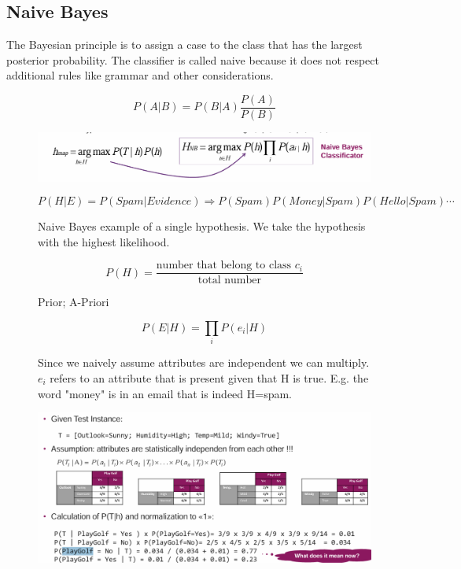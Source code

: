 \documentclass[../Main.tex]{subfiles}
\begin{document}
\subsection{Naive Bayes}
The Bayesian principle is to assign a case to the 
class that has the largest posterior probability.
The classifier is called naive because it does not respect additional rules like grammar and other considerations.
\begin{figure}[H]
    \begin{equation}
        P(A|B) = P(B|A) \frac{P(A)}{P(B)}
    \end{equation}
\end{figure}
\begin{figure}[H]
    \centering
    \includegraphics[width=0.75\linewidth]{Images/datan/naive-bayes.png}
\end{figure}
\begin{figure}[H]
    \begin{equation}
        P(H|E) = P(Spam|Evidence) \Rightarrow P(Spam) P(Money | Spam) P(Hello | Spam) \cdots
    \end{equation}
    \caption{Naive Bayes example of a single hypothesis. We take the hypothesis with the highest likelihood.}
\end{figure}
\begin{figure}[H]
    \begin{equation}
        P(H) = \frac{\text{number that belong to class }c_i}{\text{total number}}
    \end{equation}
    \caption{Prior; A-Priori}
\end{figure}
\begin{figure}[H]
    \begin{equation}
        P(E|H) = \prod_i P(e_i|H)
    \end{equation}
    \caption{Since we naively assume attributes are independent we can multiply. \(e_i\) refers to an attribute
    that is present given that H is true. E.g. the word "money" is in an email that is indeed H=spam.}
\end{figure}
\begin{figure}[H]
    \centering
    \includegraphics[width=0.75\linewidth]{Images/datan/naive-bayes-example.png}
\end{figure}
\end{document}
